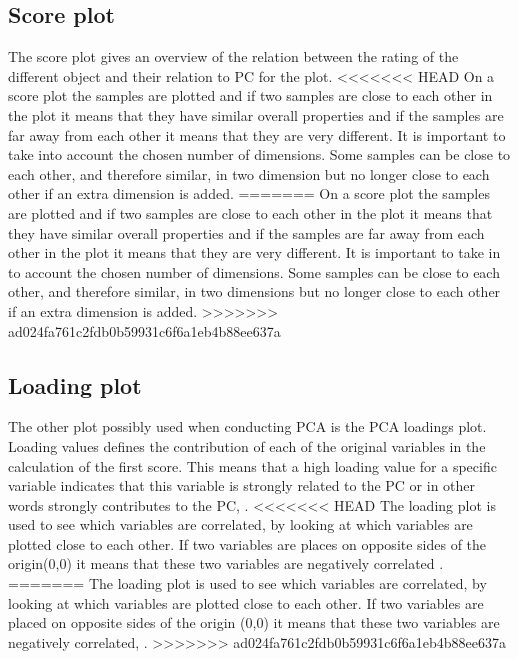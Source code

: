 \subsection*{Score plot}
The score plot gives an overview of the relation between the rating of the different object and their relation to PC for the plot. \blankline
%
%
<<<<<<< HEAD
On a score plot the samples are plotted and if two samples are close to each other in the plot it means that they have similar overall properties and if the samples are far away from each other it means that they are very different. It is important to take into account the chosen number of dimensions. Some samples can be close to each other, and therefore similar, in two dimension but no longer close to each other if an extra dimension is added. 
=======
On a score plot the samples are plotted and if two samples are close to each other in the plot it means that they have similar overall properties and if the samples are far away from each other in the plot it means that they are very different. It is important to take in to account the chosen number of dimensions. Some samples can be close to each other, and therefore similar, in two dimensions but no longer close to each other if an extra dimension is added. 
>>>>>>> ad024fa761c2fdb0b59931c6f6a1eb4b88ee637a
%
\subsection*{Loading plot}
The other plot possibly used when conducting PCA is the PCA loadings plot.
Loading values defines the contribution of each of the original variables in the calculation of the first score. This means that a high loading value for a specific variable indicates that this variable is strongly related to the PC or in other words strongly contributes to the PC, \parencite[p. 212]{Naes2010}. \blankline
%
<<<<<<< HEAD
The loading plot is used to see which variables are correlated, by looking at which variables are plotted close to each other. If two variables are places on opposite sides of the origin(0,0) it means that these two variables are negatively correlated \parencite[p. 216]{Naes2010}.
=======
The loading plot is used to see which variables are correlated, by looking at which variables are plotted close to each other. If two variables are placed on opposite sides of the origin (0,0) it means that these two variables are negatively correlated, \parencite[p. 216]{Naes2010}. 
>>>>>>> ad024fa761c2fdb0b59931c6f6a1eb4b88ee637a
%
